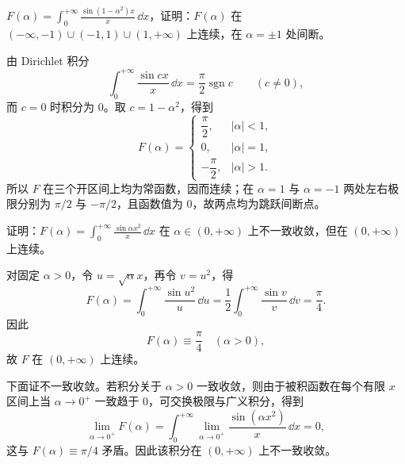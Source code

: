 \begin{xexercise}[2]
$F(\alpha)=\displaystyle\int_0^{+\infty}\frac{\sin(1-\alpha^2)x}{x}\,\dd x$，证明：$F(\alpha)$ 在 $(-\infty,-1)\cup(-1,1)\cup(1,+\infty)$ 上连续，在 $\alpha=\pm1$ 处间断。
\end{xexercise}
\begin{xsolution}
由 Dirichlet 积分
\[
\int_0^{+\infty}\frac{\sin cx}{x}\,\dd x
=\frac\pi2\operatorname{sgn}c
\qquad(c\neq0),
\]
而 $c=0$ 时积分为 $0$。取 $c=1-\alpha^2$，得到
\[
F(\alpha)=
\begin{cases}
\dfrac\pi2,&|\alpha|<1,\\
0,&|\alpha|=1,\\
-\dfrac\pi2,&|\alpha|>1.
\end{cases}
\]
所以 $F$ 在三个开区间上均为常函数，因而连续；在 $\alpha=1$ 与 $\alpha=-1$ 两处左右极限分别为 $\pi/2$ 与 $-\pi/2$，且函数值为 $0$，故两点均为跳跃间断点。
\end{xsolution}


\begin{xexercise}[3]
证明：$F(\alpha)=\displaystyle\int_0^{+\infty}\frac{\sin\alpha x^2}{x}\,\dd x$ 在 $\alpha\in(0,+\infty)$ 上不一致收敛，但在 $(0,+\infty)$ 上连续。
\end{xexercise}
\begin{xsolution}
对固定 $\alpha>0$，令 $u=\sqrt\alpha x$，再令 $v=u^2$，得
\[
F(\alpha)=\int_0^{+\infty}\frac{\sin u^2}{u}\,\dd u
=\frac12\int_0^{+\infty}\frac{\sin v}{v}\,\dd v
=\frac\pi4.
\]
因此
\[
\boxed{F(\alpha)\equiv\frac\pi4\quad(\alpha>0)},
\]
故 $F$ 在 $(0,+\infty)$ 上连续。

下面证不一致收敛。若积分关于 $\alpha>0$ 一致收敛，则由于被积函数在每个有限 $x$ 区间上当 $\alpha\to0^+$ 一致趋于 $0$，可交换极限与广义积分，得到
\[
\lim_{\alpha\to0^+}F(\alpha)
=\int_0^{+\infty}\lim_{\alpha\to0^+}
\frac{\sin(\alpha x^2)}x\,\dd x=0,
\]
这与 $F(\alpha)\equiv\pi/4$ 矛盾。因此该积分在 $(0,+\infty)$ 上不一致收敛。
\end{xsolution}


